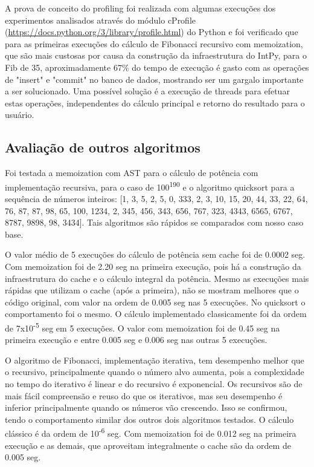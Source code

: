 \documentclass[sigconf]{acmart}
\begin{document}
A prova de conceito do profiling foi realizada com algumas execuções dos experimentos analisados através do módulo cProfile (\url{https://docs.python.org/3/library/profile.html}) do Python e foi verificado que para as primeiras execuções do cálculo de Fibonacci recursivo com memoization, que são mais custosas por causa da construção da infraestrutura do IntPy, para o Fib de 35, aproximadamente 67\% do tempo de execução é gasto com as operações de "insert" e "commit" no banco de dados, mostrando ser um gargalo importante a ser solucionado. Uma possível solução é a execução de threads para efetuar estas operações, independentes do cálculo principal e retorno do resultado para o usuário.

\subsection{Avaliação de outros algoritmos}
Foi testada a memoization com AST para o cálculo de potência com implementação recursiva, para o caso de 100\textsuperscript{190} e o algoritmo quicksort para a sequência de números inteiros: [1, 3, 5, 2, 5, 0, 333, 2, 3, 10, 15, 20, 44, 33, 22, 64, 76, 87, 87, 98, 65, 100, 1234, 2, 345, 456, 343, 656, 767, 323, 4343, 6565, 6767, 8787, 9898, 98, 3434]. Tais algoritmos são rápidos se comparados com nosso caso base.

O valor médio de 5 execuções do cálculo de potência sem cache foi de 0.0002 seg. Com memoization foi de 2.20 seg na primeira execução, pois há a construção da infraestrutura do cache e o cálculo integral da potência. Mesmo as execuções mais rápidas que utilizam o cache (após a primeira), não se mostram melhores que o código original, com valor na ordem de 0.005 seg nas 5 execuções. No quicksort o comportamento foi o mesmo. O cálculo implementado classicamente foi da ordem de 7x10\textsuperscript{-5} seg em 5 execuções. O valor com memoization foi de 0.45 seg na primeira execução e entre 0.005 seg e 0.006 seg nas outras 5 execuções.

O algoritmo de Fibonacci, implementação iterativa, tem desempenho melhor que o recursivo, principalmente quando o número alvo aumenta, pois a complexidade no tempo do iterativo é linear e do recursivo é exponencial. Os recursivos são de mais fácil compreensão e reuso do que os iterativos, mas seu desempenho é inferior principalmente quando os números vão crescendo. Isso se confirmou, tendo o comportamento similar dos outros dois algoritmos testados. O cálculo clássico é da ordem de 10\textsuperscript{-6} seg. Com memoization foi de 0.012 seg na primeira execução e as demais, que aproveitam integralmente o cache são da ordem de 0.005 seg.
\end{document}
